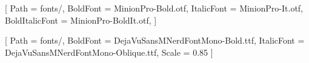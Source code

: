 

\setlength{\parindent}{0pt}



\setmainfont{MinionPro-Regular.otf}[
  Path = fonts/,
  BoldFont = MinionPro-Bold.otf,
  ItalicFont = MinionPro-It.otf,
  BoldItalicFont = MinionPro-BoldIt.otf,
]

\setmonofont{DejaVuSansMNerdFontMono-Regular.ttf}[
  Path = fonts/,
  BoldFont = DejaVuSansMNerdFontMono-Bold.ttf,
  ItalicFont = DejaVuSansMNerdFontMono-Oblique.ttf,
  Scale = 0.85
]




